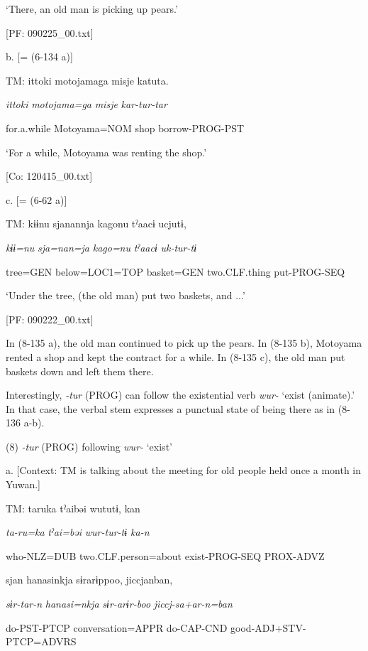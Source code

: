       ‘There, an old man is picking up pears.’

      [PF: 090225\_00.txt]

  b.  [= (6-134 a)]

    TM:  {\textbar}ittoki{\textbar}  motojamaga  misje  katuta.

      \textit{ittoki}  \textit{motojama=ga}  \textit{misje}  \textit{kar-tur{}-tar}

      for.a.while  Motoyama=NOM  shop  borrow-PROG-PST

      ‘For a while, Motoyama was renting the shop.’

      [Co: 120415\_00.txt]

  c.  [= (6-62 a)]

    TM:  kɨɨnu  sjanannja  kagonu  tˀaacɨ  ucjutɨ,

      \textit{kɨɨ=nu}  \textit{sja=nan=ja}  \textit{kago=nu}  \textit{tˀaacɨ}  \textit{uk-tur{}-tɨ}

      tree=GEN  below=LOC1=TOP  basket=GEN  two.CLF.thing  put-PROG-SEQ

      ‘Under the tree, (the old man) put two baskets, and ...’

      [PF: 090222\_00.txt]

In (8-135 a), the old man continued to pick up the pears. In (8-135 b), Motoyama rented a shop and kept the contract for a while. In (8-135 c), the old man put baskets down and left them there.

  Interestingly, \textit{{}-tur} (PROG) can follow the existential verb \textit{wur-} ‘exist (animate).’ In that case, the verbal stem expresses a punctual state of being there as in (8-136 a-b).

(8)  \textit{{}-tur} (PROG) following \textit{wur-} ‘exist’

  a.  [Context: TM is talking about the meeting for old people held once a month in Yuwan.]

    TM:  taruka  tˀaibəi  wututɨ,  kan

      \textit{ta-ru=ka}  \textit{tˀai=bəi}  \textit{wur-tur{}-tɨ  ka-n}

      who-NLZ=DUB  two.CLF.person=about  exist-PROG-SEQ  PROX-ADVZ

      sjan  hanasinkja  sɨrarɨppoo,  jiccjanban,

      \textit{sɨr-tar-n}  \textit{hanasi=nkja}  \textit{sɨr-arɨr-boo}  \textit{jiccj-sa+ar-n=ban}

      do-PST-PTCP  conversation=APPR  do-CAP-CND  good-ADJ+STV-PTCP=ADVRS

